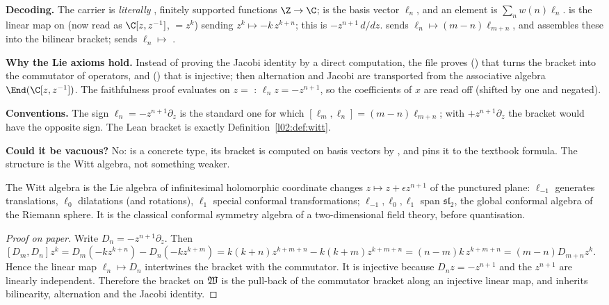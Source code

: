 \begin{dictionary}
\textbf{Decoding.} The carrier  is \emph{literally} , finitely supported
functions $\Z\to\C$;  is the basis vector $\ell_n$, and an element
 is $\sum_n w(n)\ell_n$.  is the linear map on  (now read as
$\C[z,z^{-1}]$,  $= z^k$) sending $z^k\mapsto -k\,z^{k+n}$; this is
$-z^{n+1}\,d/dz$.  sends $\ell_n\mapsto (m-n)\ell_{m+n}$, and 
assembles these into the bilinear bracket;  sends $\ell_n\mapsto$ .

\textbf{Why the Lie axioms hold.} Instead of proving the Jacobi identity by a direct computation,
the file proves () that  turns the bracket into the commutator of
operators, and () that  is injective; then alternation and Jacobi are
transported from the associative algebra $\End(\C[z,z^{-1}])$. The faithfulness proof evaluates
 on $z = $ : $\ell_n z = -z^{n+1}$, so the coefficients of $x$ are read
off (shifted by one and negated).

\textbf{Conventions.} The sign $\ell_n = -z^{n+1}\partial_z$ is the standard one for which
$[\ell_m,\ell_n] = (m-n)\ell_{m+n}$; with $+z^{n+1}\partial_z$ the bracket would have the opposite
sign. The Lean bracket  is exactly Definition~\ref{l02:def:witt}.

\textbf{Could it be vacuous?} No:  is a concrete type, its bracket is computed on basis
vectors by , and  pins it to the textbook formula. The
structure is the Witt algebra, not something weaker.
\end{dictionary}

\begin{physics}
The Witt algebra is the Lie algebra of infinitesimal holomorphic coordinate changes
$z\mapsto z + \epsilon z^{n+1}$ of the punctured plane: $\ell_{-1}$ generates translations, $\ell_0$
dilatations (and rotations), $\ell_1$ special conformal transformations; $\ell_{-1},\ell_0,\ell_1$
span $\mathfrak{sl}_2$, the global conformal algebra of the Riemann sphere. It is the classical
conformal symmetry algebra of a two-dimensional field theory, before quantisation.
\end{physics}

\begin{proof}[Proof on paper]
Write $D_n = -z^{n+1}\partial_z$. Then $[D_m,D_n]z^k = D_m(-kz^{k+n}) - D_n(-kz^{k+m}) =
k(k+n)z^{k+m+n} - k(k+m)z^{k+m+n} = (n-m)k\,z^{k+m+n} = (m-n)D_{m+n}z^k$. Hence the linear map
$\ell_n\mapsto D_n$ intertwines the bracket with the commutator. It is injective because
$D_n z = -z^{n+1}$ and the $z^{n+1}$ are linearly independent. Therefore the bracket on
$\mathfrak{W}$ is the pull-back of the commutator bracket along an injective linear map, and inherits
bilinearity, alternation and the Jacobi identity.
\end{proof}

